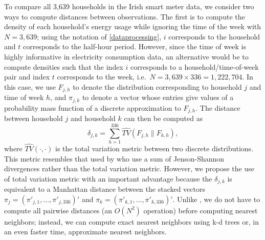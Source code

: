 \documentclass{article}
\begin{document}
To compare all 3,639 households in the Irish smart meter data, we
consider two ways to compute distances between observations. The first
is to compute the density of each household's energy usage while
ignoring the time of the week with \(N=3,639\); using the notation of
\autoref{dataprocessing}, \(i\) corresponds to the household and \(t\)
corresponds to the half-hour period. However, since the time of week is
highly informative in electricity consumption data, an alternative would
be to compute densities such that the index \(i\) corresponds to a
household/time-of-week pair and index \(t\) corresponds to the week,
i.e.~\(N=3,639 \times 336=1,222,704\). In this case, we use \(F_{j,h}\)
to denote the distribution corresponding to household \(j\) and time of
week \(h\), and \(\pi_{j,k}\) to denote a vector whose entries give
values of a probability mass function of a discrete approximation to
\(F_{j,h}\). The distance between household \(j\) and household \(k\)
can then be computed as \begin{equation}\label{eq:betweenhhmetric}
  \delta_{j,k}=\sum\limits_{h=1}^{336}\hat{TV}(F_{j,h}\|F_{k,h}),
\end{equation} where \(\hat{TV}(\cdot,\cdot)\) is the total variation
metric between two discrete distributions. This metric resembles that
used by \citet{Hyndman2018-ia} who use a sum of Jenson-Shannon
divergences rather than the total variation metric. However, we propose
the use of total variation metric with an important advantage because
the \(\delta_{j,k}\) is equivalent to a Manhattan distance between the
stacked vectors \(\pi_j=(\pi'_{j,1},\ldots,\pi'_{j,336})'\) and
\(\pi_k=(\pi'_{k,1},\ldots,\pi'_{k,336})'\). Unlike
\citet{Hyndman2018-ia}, we do not have to compute all pairwise distances
(an \(O(N^2)\) operation) before computing nearest neighbors; instead,
we can compute exact nearest neighbors using k-d trees or, in an even
faster time, approximate nearest neighbors.
\end{document}

